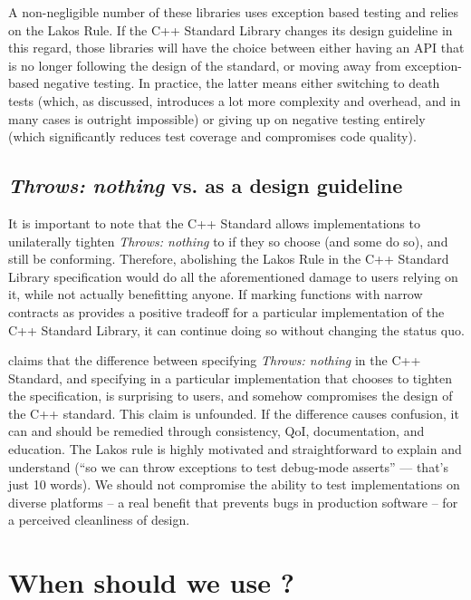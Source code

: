 A non-negligible number of these libraries uses exception based testing and relies on the Lakos Rule. If the C++ Standard Library changes its design guideline in this regard, those libraries will have the choice between either having an API that is no longer following the design of the standard, or moving away from exception-based negative testing. In practice, the latter means either switching to death tests (which, as discussed, introduces a lot more complexity and overhead, and in many cases is outright impossible) or giving up on negative testing entirely (which significantly reduces test coverage and compromises code quality).

\subsection{\emph{Throws: nothing} vs.  as a design guideline}

It is important to note that the C++ Standard allows implementations to unilaterally tighten \emph{Throws: nothing} to  if they so choose (and some do so), and still be conforming. Therefore, abolishing the Lakos Rule in the C++ Standard Library specification would do all the aforementioned damage to users relying on it, while not actually benefitting anyone. If marking functions with narrow contracts as  provides a positive tradeoff for a particular implementation of the C++ Standard Library, it can continue doing so without changing the status quo.

\cite{P1656R2} claims that the difference between specifying \emph{Throws: nothing} in the C++ Standard, and specifying  in a particular implementation that chooses to tighten the specification, is surprising to users, and somehow compromises the design of the C++ standard. This claim is unfounded. If the difference causes confusion, it can and should be remedied through consistency, QoI, documentation, and education. The Lakos rule is highly motivated and straightforward to explain and understand (``so we can throw exceptions to test debug-mode asserts'' --- that's just 10 words). We should not compromise the ability to test implementations on diverse platforms -- a real benefit that prevents bugs in production software -- for a perceived cleanliness of design.

\section{When should we use ?}
\label{sec:noexcept}

